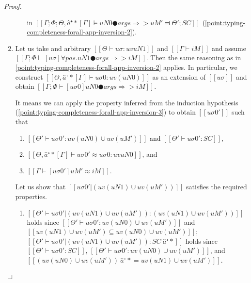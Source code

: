 \begin{proof}
\begin{caseof}
\begin{enumerate}
\begin{enumerate}
                            in $[[ Γ; Φ; Θ, â⁺*[Γ] ⊨ uN0 ● args ⇒> uM' ⫤ Θ'; SC ]]$
                            (\ref{point:typing-completeness-forall-app-inversion-2}).
                    \end{enumerate}
                \item Let us take and arbitrary $[[Θ ⊢ uσ : uv uN1]]$ and $[[Γ ⊢ iM]]$
                    and assume $[[Γ; Φ ⊢ [uσ]∀pas.uN1  ● args ⇒> iM]]$. 
                    Then the same reasoning as in 
                    \ref{point:typing-completeness-forall-app-inversion-2}
                    applies. In particular, we construct 
                    $[[Θ, â⁺*[Γ] ⊢ uσ0 : uv(uN0)]]$ 
                        as an extension of $[[uσ]]$ and obtain 
                    $[[Γ; Φ ⊢ [uσ0]uN0 ● args ⇒> iM]]$.

                    It means we can apply the property inferred from the induction 
                    hypothesis (\ref{point:typing-completeness-forall-app-inversion-3})
                    to obtain $[[uσ0']]$ such that 
                    \begin{enumerate}
                        \item $[[Θ' ⊢ uσ0' : uv(uN0) ∪ uv(uM')]]$ and $[[ Θ'  ⊢ uσ0' : SC ]] $,
                        \item $[[Θ, â⁺*[Γ] ⊢ uσ0' ≈ uσ0 : uv uN0]]$, and 
                        \item $[[Γ ⊢ [uσ0']uM' ≈ iM]]$.
                    \end{enumerate}

                    Let us show that $[[uσ0'|(uv(uN1) ∪ uv(uM'))]]$ 
                    satisfies the required properties.
                    \begin{enumerate}
                        \item $[[Θ' ⊢ uσ0'|(uv(uN1) ∪ uv(uM')): (uv(uN1) ∪ uv(uM'))]]$
                            holds since $[[ Θ' ⊢ uσ0' : uv(uN0) ∪ uv(uM')]]$
                            and $[[uv(uN1) ∪ uv(uM') ⊆ uv(uN0) ∪ uv(uM')]]$;
                            $[[ Θ' ⊢ uσ0'|(uv(uN1) ∪ uv(uM')) : SC \ {â⁺*} ]]$ holds since
                            $[[ Θ' ⊢ uσ0' : SC ]]$,
                            $[[ Θ' ⊢ uσ0' : uv(uN0) ∪ uv(uM') ]]$,
                            and $[[(uv(uN0) ∪ uv(uM')) \ {â⁺*} = uv(uN1) ∪ uv(uM')]]$.


\end{enumerate}
\end{enumerate}
\end{caseof}
\end{proof}
